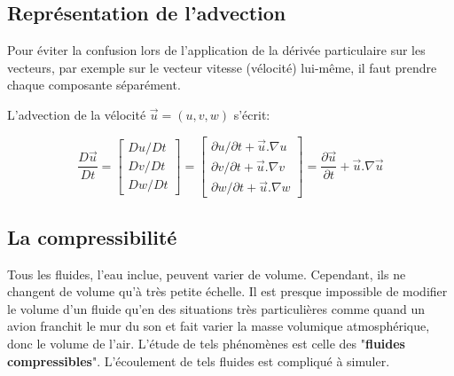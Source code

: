 \documentclass[11pt]{article}
\begin{document}
\subsection{Représentation de l'advection}

Pour éviter la confusion lors de l'application de la dérivée particulaire sur les vecteurs, par exemple sur le vecteur vitesse  (vélocité) lui-même, il faut prendre chaque composante séparément.

L'advection de la vélocité $ \overrightarrow{u} = (u, v, w) $ s'écrit:

\[
\frac{D\overrightarrow{u}}{Dt} = 
  \left[
	\begin{array}{c}
		Du/Dt\\
		Dv/Dt\\
		Dw/Dt
	\end{array}
 \right] = 
 \left[
	\begin{array}{c}
		\partial u/\partial t + \overrightarrow{u} . \nabla u \\
		\partial v/\partial t + \overrightarrow{u} . \nabla v \\
		\partial w/\partial t + \overrightarrow{u} . \nabla w
	\end{array}
 \right] = 
 \frac{\partial \overrightarrow{u}}{\partial t} + \overrightarrow{u} . \nabla \overrightarrow{u}
\]
\subsection{La compressibilité}

Tous les fluides, l'eau inclue, peuvent varier de volume. Cependant, ils ne changent de volume qu'à très petite échelle. Il est presque impossible de modifier le volume d'un fluide qu'en des situations très particulières comme quand un avion franchit le mur du son et fait varier la masse volumique atmosphérique, donc le volume de l'air. L'étude de tels phénomènes est celle des "\textbf{fluides compressibles}". L'écoulement de tels fluides est compliqué à simuler.
\end{document}
